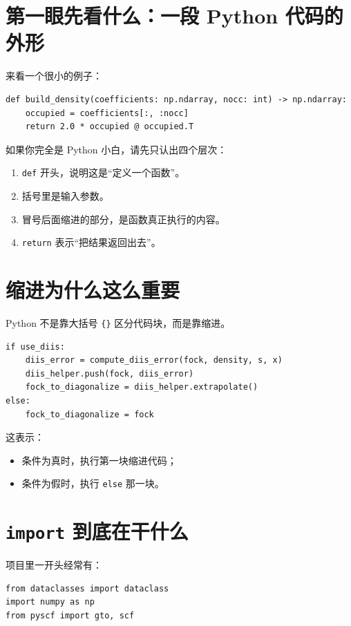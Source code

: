 \documentclass[UTF8,11pt,fontset=fandol]{ctexbook}
\begin{document}
\section{第一眼先看什么：一段 Python 代码的外形}

来看一个很小的例子：

\begin{lstlisting}[style=pythonstyle]
def build_density(coefficients: np.ndarray, nocc: int) -> np.ndarray:
    occupied = coefficients[:, :nocc]
    return 2.0 * occupied @ occupied.T
\end{lstlisting}

如果你完全是 Python 小白，请先只认出四个层次：

\begin{enumerate}[label=\arabic*.]
  \item \texttt{def} 开头，说明这是“定义一个函数”。
  \item 括号里是输入参数。
  \item 冒号后面缩进的部分，是函数真正执行的内容。
  \item \texttt{return} 表示“把结果返回出去”。
\end{enumerate}

\section{缩进为什么这么重要}

Python 不是靠大括号 \texttt{\{\}} 区分代码块，而是靠缩进。

\begin{lstlisting}[style=pythonstyle]
if use_diis:
    diis_error = compute_diis_error(fock, density, s, x)
    diis_helper.push(fock, diis_error)
    fock_to_diagonalize = diis_helper.extrapolate()
else:
    fock_to_diagonalize = fock
\end{lstlisting}

这表示：
\begin{itemize}
  \item 条件为真时，执行第一块缩进代码；
  \item 条件为假时，执行 \texttt{else} 那一块。
\end{itemize}

\section{\texttt{import} 到底在干什么}

项目里一开头经常有：
\begin{lstlisting}[style=pythonstyle]
from dataclasses import dataclass
import numpy as np
from pyscf import gto, scf
\end{lstlisting}
\end{document}

